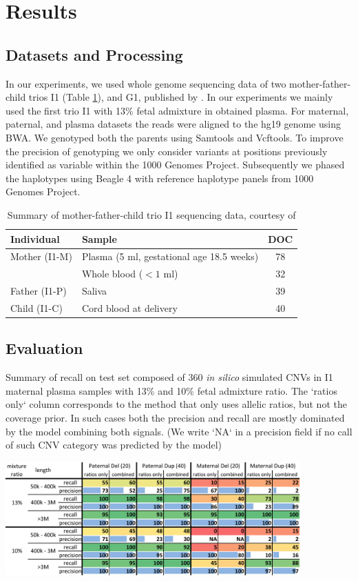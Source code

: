 \section{Results}

\subsection{Datasets and Processing}
\label{data}
In our experiments, we used whole genome sequencing data of two mother-father-child trios I1 (Table \ref{tab:I1}), and G1, published by \cite{kitzman2012}. In our experiments we mainly used the first trio I1 with 13\% fetal admixture in obtained plasma. For maternal, paternal, and plasma datasets the reads were aligned to the hg19 genome using BWA. We genotyped both the parents using Samtools and Vcftools. To improve the precision of genotyping we only consider variants at positions previously identified as variable within the 1000 Genomes Project.  Subsequently we phased the haplotypes using Beagle 4 \citep{browning2013} with reference haplotype panels from 1000 Genomes Project. 
\begin{table}
\caption{Summary of mother-father-child trio I1 sequencing data, courtesy of \cite{kitzman2012}  }
\label{tab:I1}
\centering
\footnotesize
\begin{tabular}{l|l|c}
\hline
Individual & Sample & DOC \\ \hline\hline
Mother (I1-M) & Plasma (5 ml, gestational age 18.5 weeks) & 78 \\
	& Whole blood ($<1$ ml) & 32 \\
Father (I1-P) & Saliva & 39 \\
Child (I1-C) & Cord blood at delivery & 40 \\
\hline
\end{tabular}
\end{table}

\subsection{Evaluation}
\begin{table}
\caption{Summary of recall on test set composed of 360 \emph{in silico} simulated CNVs in I1 maternal plasma samples with 13\% and 10\% fetal admixture ratio. The `ratios only` column corresponds to the method that only uses allelic ratios, but not the coverage prior. In such cases both the precision and  recall are mostly dominated by the model combining both signals. (We write `NA` in a precision field if no call of such CNV category was predicted by the model)}
\label{tab:resRecall}
\centering
\includegraphics[width=0.85\textwidth]{figures/ismb_res_color}
\end{table}

